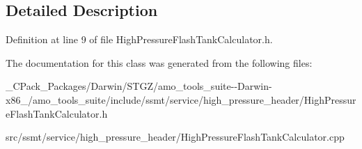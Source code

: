 \subsection{Detailed Description}


Definition at line 9 of file High\+Pressure\+Flash\+Tank\+Calculator.\+h.



The documentation for this class was generated from the following files\+:\begin{DoxyCompactItemize}
\item 
\+\_\+\+C\+Pack\+\_\+\+Packages/\+Darwin/\+S\+T\+G\+Z/amo\+\_\+tools\+\_\+suite-\/-\/\+Darwin-\/x86\+\_/amo\+\_\+tools\+\_\+suite/include/ssmt/service/high\+\_\+pressure\+\_\+header/High\+Pressure\+Flash\+Tank\+Calculator.\+h\item 
src/ssmt/service/high\+\_\+pressure\+\_\+header/High\+Pressure\+Flash\+Tank\+Calculator.\+cpp\end{DoxyCompactItemize}

